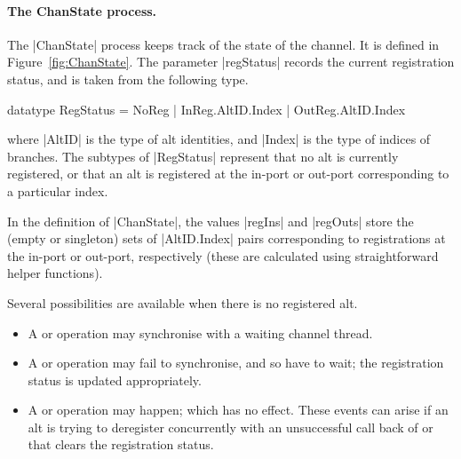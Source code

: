 
\paragraph{The {\cspmstyle ChanState} process.}

The |ChanState| process keeps track of the state of the channel.  It is
defined in Figure~\ref{fig:ChanState}.
The parameter |regStatus| records the current registration status, and is
taken from the following type.
%
\begin{cspm}
datatype RegStatus = NoReg | InReg.AltID.Index | OutReg.AltID.Index
\end{cspm}
%
where |AltID| is the type of alt identities, and |Index| is the type of
indices of branches.  The subtypes of |RegStatus| represent that no alt is
currently registered, or that an alt is registered at the in-port or out-port
corresponding to a particular index.  

In the definition of |ChanState|, the values |regIns| and |regOuts| store the
(empty or singleton) sets of |AltID.Index| pairs corresponding to
registrations at the in-port or out-port, respectively (these are calculated
using straightforward helper functions).

Several possibilities are available when there is no registered alt.
%
\begin{itemize}
\item A  or  operation may synchronise
  with a waiting channel thread.

\item A  or  operation may fail to
  synchronise, and so have to wait; the registration status is updated
  appropriately.

\item A  or  operation may happen;
  which has no effect.  These events can arise if an alt is trying to
  deregister concurrently with an unsuccessful call back of
   or  that clears the registration
  status. 
\end{itemize}

